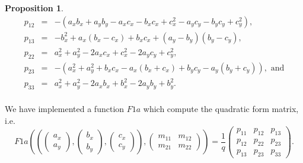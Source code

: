 \documentclass[8pt]{article}
\newtheorem{prop}{\bf Proposition}
\begin{document}
\begin{prop}
\begin{eqnarray*}
 p_{12}&=&-(a_{x} b_{x}+a_{y} b_{y}-a_{x} c_{x}-b_{x}
  c_{x}+c_{x}^2-a_{y} c_{y}-b_{y} c_{y}+c_{y}^2), \\
p_{13}&=&-b_{x}^2+a_{x} (b_{x}-c_{x})+b_{x} c_{x}+(a_{y}-b_{y}) (b_{y}-c_{y}), \\
p_{22}&=&a_{x}^2+a_{y}^2-2 a_{x} c_{x}+c_{x}^2-2 a_{y} c_{y}+c_{y}^2, \\
p_{23}&=&-(a_{x}^2+a_{y}^2+b_{x} c_{x}-a_{x} (b_{x}+c_{x})
  +b_{y} c_{y}-a_{y} (b_{y}+c_{y})), \mbox{\ and} \\
p_{33}&=&a_{x}^2+a_{y}^2-2 a_{x} b_{x}+b_{x}^2-2 a_{y} b_{y}+b_{y}^2. \\
\end{eqnarray*}
\end{prop}

\begin{screen}
We have implemented a function $F1a$ which compute the
quadratic form matrix, i.e.
$$
F1a(
\left(
\left( \begin{array}{c} a_{x} \\ a_{y} \end{array} \right),
\left( \begin{array}{c} b_{x} \\ b_{y} \end{array} \right),
\left( \begin{array}{c} c_{x} \\ c_{y} \end{array} \right)
\right),
\left(
\begin{array}{cc}
 m_{11} & m_{12} \\
 m_{21} & m_{22}
\end{array}
\right)
) = 
\frac{1}{q}
\left(
\begin{array}{ccc}
 p_{11} & p_{12} & p_{13} \\
 p_{12} & p_{22} & p_{23} \\
 p_{13} & p_{23} & p_{33}
\end{array}
\right).
$$


\end{screen}
\end{document}
